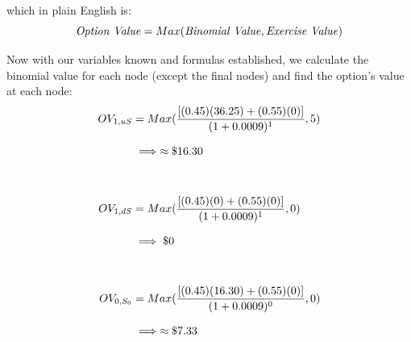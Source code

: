 \documentclass[12pt, letterpaper]{article}\usepackage{float}
\begin{document}
\noindent which in plain English is:
\begin{equation*}
  \textrm{\textit{Option Value}} = Max(\text{\textit{Binomial Value}}, \text{\textit{Exercise Value}})
\end{equation*}

\bigskip

Now with our variables known and formulas established, we calculate the binomial value for each node (except the final nodes) and find the option's value at each node:
\begin{equation*}
  \setlength{\jot}{10pt}
  \begin{split}
    OV_{1, uS}
    & = Max(\frac{[(0.45)(36.25) + (0.55)(0)]}{(1+0.0009)^1}, 5) \\
    & \implies \approx\$16.30 \\
    \\
    OV_{1, dS}
    & = Max(\frac{[(0.45)(0) + (0.55)(0)]}{(1+0.0009)^1}, 0) \\
    & \implies \$0 \\
    \\
    OV_{0, S_0}
    & = Max(\frac{[(0.45)(16.30) + (0.55)(0)]}{(1+0.0009)^0}, 0) \\
    & \implies \approx\$7.33
  \end{split}
\end{equation*}
\end{document}
